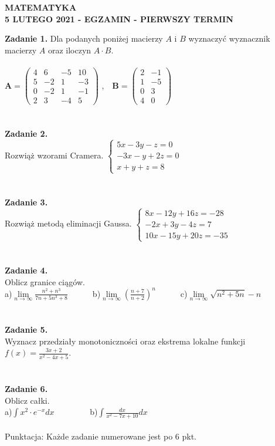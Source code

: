 \documentclass[12pt,a4paper]{report}
\begin{document}
\begin{center}

\textbf{MATEMATYKA \\5 LUTEGO 2021 - EGZAMIN - PIERWSZY TERMIN}

\end{center}\textbf{Zadanie 1.} Dla podanych poniżej macierzy $A$ i $B$ wyznaczyć wyznacznik macierzy $A$ oraz iloczyn $A\cdot B$. \\\\ $ \mathbf{A} = \left( \begin{array}{cccc} 4 & 6& -5 & 10\\5 & -2& 1 & -3\\0 & -2& 1 & -1\\2 & 3 & -4 & 5 \end{array} \right)$ ,\ \ $\mathbf{B} =\left( \begin{array}{cccc}2 & -1\\1 & -5\\0 & 3\\4 & 0  \end{array} \right)$\\\\\\\textbf{Zadanie 2.} \\Rozwiąż wzorami Cramera. $\left\{ \begin{array}{ll}5x-3y-z=0\\-3x-y+2z=0\\x+y+z=8\end{array} \right.$\\\\\\\textbf{Zadanie 3.} \\Rozwiąż metodą eliminacji Gaussa. $\left\{ \begin{array}{ll}8x-12y+16z=-28\\-2x+3y-4z=7\\10x-15y+20z=-35\end{array} \right.$\\\\\\\textbf{Zadanie 4.} \\Oblicz granice ciągów.\\a)$\lim\limits_{n\to\infty}\frac{n^2+n^3}{7n+5n^3+8}$\ \ \ \ \ \  b)$\lim\limits_{n\to \infty}(\frac{n+7}{n+2})^n$\ \ \ \ \ \ c)$\lim\limits_{n\to\infty} \sqrt{n^2+5n}-n$\\\\\\\textbf{Zadanie 5.} \\Wyznacz przedziały monotoniczności oraz ekstrema lokalne funkcji $f(x)=\frac{3x+2}{x^2-4x+5}$.\\\\\\\textbf{Zadanie 6.} \\Oblicz całki. \\a)$\int x^2\cdot e^{-x} dx$ \ \ \ \ \ \ \ \ b)$\int \frac{dx}{x^2-7x+10} dx$\\\\Punktacja: Każde zadanie numerowane jest po 6 pkt.
\end{document}
